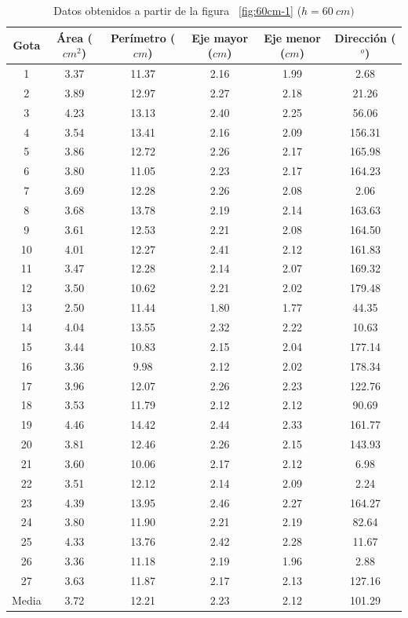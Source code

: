\begin{table}[H] \centering \caption{Datos obtenidos a partir de la figura
    ~\ref{fig:60cm-1} ($h=60\ cm)$} \label{tab:60cm} \begin{tabular}{cccccc}
        \toprule Gota & Área ($cm^2$) & Perímetro ($cm$) & Eje mayor ($cm$) &
        Eje menor ($cm$) & Dirección ($^o$) \\ \midrule 1  & 3.37 & 11.37 &
        2.16 & 1.99 & 2.68   \\ 2  & 3.89 & 12.97 & 2.27 & 2.18 & 21.26  \\ 3
             & 4.23 & 13.13 & 2.40 & 2.25 & 56.06  \\ 4  & 3.54 & 13.41 & 2.16
             & 2.09 & 156.31 \\ 5  & 3.86 & 12.72 & 2.26 & 2.17 & 165.98 \\ 6
             & 3.80 & 11.05 & 2.23 & 2.17 & 164.23 \\ 7  & 3.69 & 12.28 & 2.26
             & 2.08 & 2.06   \\ 8  & 3.68 & 13.78 & 2.19 & 2.14 & 163.63 \\ 9
             & 3.61 & 12.53 & 2.21 & 2.08 & 164.50 \\ 10 & 4.01 & 12.27 & 2.41
             & 2.12 & 161.83 \\ 11 & 3.47 & 12.28 & 2.14 & 2.07 & 169.32 \\ 12
             & 3.50 & 10.62 & 2.21 & 2.02 & 179.48 \\ 13 & 2.50 & 11.44 & 1.80
             & 1.77 & 44.35  \\ 14 & 4.04 & 13.55 & 2.32 & 2.22 & 10.63  \\ 15
             & 3.44 & 10.83 & 2.15 & 2.04 & 177.14 \\ 16 & 3.36 & 9.98  & 2.12
             & 2.02 & 178.34 \\ 17 & 3.96 & 12.07 & 2.26 & 2.23 & 122.76 \\ 18
             & 3.53 & 11.79 & 2.12 & 2.12 & 90.69  \\ 19 & 4.46 & 14.42 & 2.44
             & 2.33 & 161.77 \\ 20 & 3.81 & 12.46 & 2.26 & 2.15 & 143.93 \\ 21
             & 3.60 & 10.06 & 2.17 & 2.12 & 6.98   \\ 22 & 3.51 & 12.12 & 2.14
             & 2.09 & 2.24   \\ 23 & 4.39 & 13.95 & 2.46 & 2.27 & 164.27 \\ 24
             & 3.80 & 11.90 & 2.21 & 2.19 & 82.64  \\ 25 & 4.33 & 13.76 & 2.42
             & 2.28 & 11.67  \\ 26 & 3.36 & 11.18 & 2.19 & 1.96 & 2.88   \\ 27
             & 3.63 & 11.87 & 2.17 & 2.13 & 127.16 \\ \midrule Media & 3.72 &
    12.21 & 2.23 & 2.12 & 101.29 \\ \bottomrule \end{tabular} \end{table}

